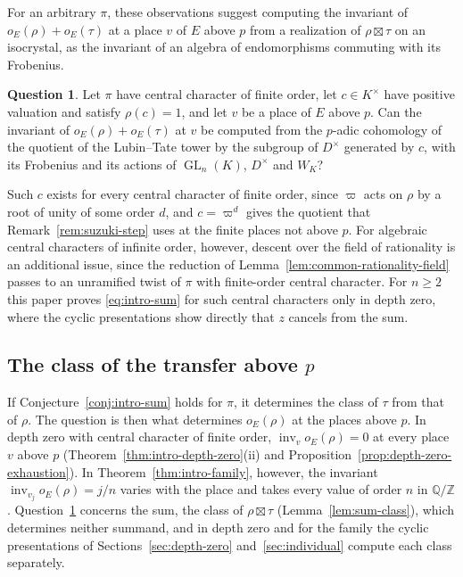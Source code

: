 \documentclass[a4paper,11pt]{amsart}
\theoremstyle{definition}
\newtheorem{question}[theorem]{Question}
\theoremstyle{remark}
\numberwithin{equation}{section}
\newcommand{\Q}{\mathbb{Q}}
\newcommand{\Z}{\mathbb{Z}}
\DeclareMathOperator{\inv}{inv}
\DeclareMathOperator{\GL}{GL}
\begin{document}
For an arbitrary $\pi$, these observations suggest computing the invariant of $o_E(\rho)+o_E(\tau)$ at a place $v$ of $E$ above $p$ from a realization of $\rho\boxtimes\tau$ on an isocrystal, as the invariant of an algebra of endomorphisms commuting with its Frobenius.

\begin{question}\label{q:above-p}
Let $\pi$ have central character of finite order, let $c\in K^\times$ have positive valuation and satisfy $\rho(c)=1$, and let $v$ be a place of $E$ above $p$. Can the invariant of $o_E(\rho)+o_E(\tau)$ at $v$ be computed from the $p$-adic cohomology of the quotient of the Lubin--Tate tower by the subgroup of $D^\times$ generated by $c$, with its Frobenius and its actions of $\GL_n(K)$, $D^\times$ and $W_K$?
\end{question}

Such $c$ exists for every central character of finite order, since $\varpi$ acts on $\rho$ by a root of unity of some order $d$, and $c=\varpi^d$ gives the quotient that Remark~\ref{rem:suzuki-step} uses at the finite places not above $p$. For algebraic central characters of infinite order, however, descent over the field of rationality is an additional issue, since the reduction of Lemma~\ref{lem:common-rationality-field} passes to an unramified twist of $\pi$ with finite-order central character. For $n\ge2$ this paper proves \eqref{eq:intro-sum} for such central characters only in depth zero, where the cyclic presentations show directly that $z$ cancels from the sum.

\subsection{The class of the transfer above \texorpdfstring{$p$}{p}}\label{subsec:questions-individual}

If Conjecture~\ref{conj:intro-sum} holds for $\pi$, it determines the class of $\tau$ from that of $\rho$. The question is then what determines $o_E(\rho)$ at the places above $p$. In depth zero with central character of finite order, $\inv_vo_E(\rho)=0$ at every place $v$ above $p$ (Theorem~\ref{thm:intro-depth-zero}(ii) and Proposition~\ref{prop:depth-zero-exhaustion}). In Theorem~\ref{thm:intro-family}, however, the invariant $\inv_{v_j}o_E(\rho)=j/n$ varies with the place and takes every value of order $n$ in $\Q/\Z$. Question~\ref{q:above-p} concerns the sum, the class of $\rho\boxtimes\tau$ (Lemma~\ref{lem:sum-class}), which determines neither summand, and in depth zero and for the family the cyclic presentations of Sections~\ref{sec:depth-zero} and~\ref{sec:individual} compute each class separately.
\end{document}
